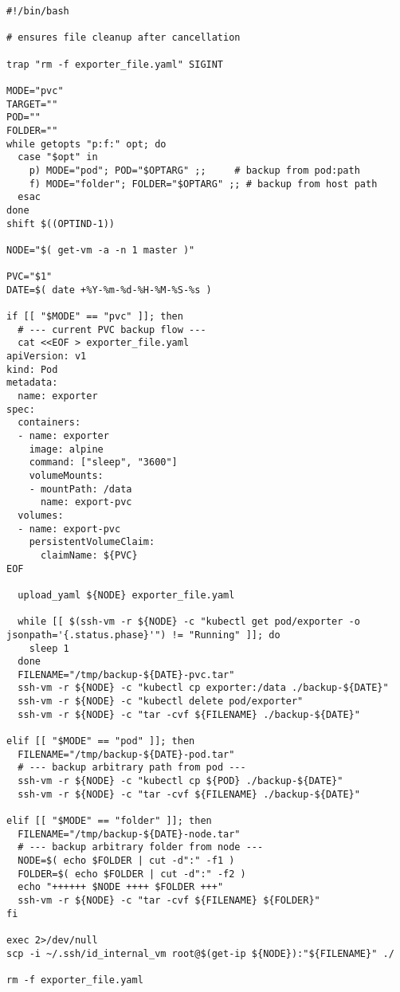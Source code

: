 \begin{verbatim}
#!/bin/bash

# ensures file cleanup after cancellation

trap "rm -f exporter_file.yaml" SIGINT

MODE="pvc"
TARGET=""
POD=""
FOLDER=""
while getopts "p:f:" opt; do
  case "$opt" in
    p) MODE="pod"; POD="$OPTARG" ;;     # backup from pod:path
    f) MODE="folder"; FOLDER="$OPTARG" ;; # backup from host path
  esac
done
shift $((OPTIND-1))

NODE="$( get-vm -a -n 1 master )"

PVC="$1"
DATE=$( date +%Y-%m-%d-%H-%M-%S-%s )

if [[ "$MODE" == "pvc" ]]; then
  # --- current PVC backup flow ---
  cat <<EOF > exporter_file.yaml
apiVersion: v1
kind: Pod
metadata:
  name: exporter
spec:
  containers:
  - name: exporter
    image: alpine
    command: ["sleep", "3600"]
    volumeMounts:
    - mountPath: /data
      name: export-pvc
  volumes:
  - name: export-pvc
    persistentVolumeClaim:
      claimName: ${PVC}
EOF

  upload_yaml ${NODE} exporter_file.yaml

  while [[ $(ssh-vm -r ${NODE} -c "kubectl get pod/exporter -o jsonpath='{.status.phase}'") != "Running" ]]; do
    sleep 1
  done
  FILENAME="/tmp/backup-${DATE}-pvc.tar"
  ssh-vm -r ${NODE} -c "kubectl cp exporter:/data ./backup-${DATE}"
  ssh-vm -r ${NODE} -c "kubectl delete pod/exporter"
  ssh-vm -r ${NODE} -c "tar -cvf ${FILENAME} ./backup-${DATE}"

elif [[ "$MODE" == "pod" ]]; then
  FILENAME="/tmp/backup-${DATE}-pod.tar"
  # --- backup arbitrary path from pod ---
  ssh-vm -r ${NODE} -c "kubectl cp ${POD} ./backup-${DATE}"
  ssh-vm -r ${NODE} -c "tar -cvf ${FILENAME} ./backup-${DATE}"

elif [[ "$MODE" == "folder" ]]; then
  FILENAME="/tmp/backup-${DATE}-node.tar"
  # --- backup arbitrary folder from node ---
  NODE=$( echo $FOLDER | cut -d":" -f1 )
  FOLDER=$( echo $FOLDER | cut -d":" -f2 ) 
  echo "++++++ $NODE ++++ $FOLDER +++"
  ssh-vm -r ${NODE} -c "tar -cvf ${FILENAME} ${FOLDER}"
fi

exec 2>/dev/null
scp -i ~/.ssh/id_internal_vm root@$(get-ip ${NODE}):"${FILENAME}" ./

rm -f exporter_file.yaml
\end{verbatim}